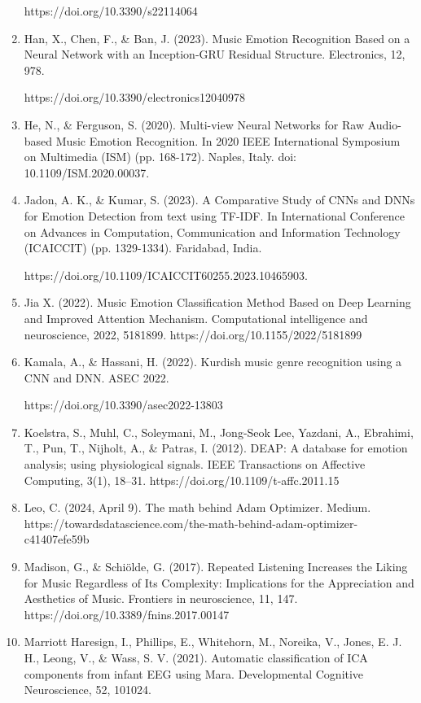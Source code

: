 \documentclass[fleqn,10pt]{SelfArx} %
\begin{document}
\begin{enumerate}
    https://doi.org/10.3390/s22114064
    \item Han, X., Chen, F., \& Ban, J. (2023). Music Emotion Recognition Based on a Neural Network with an Inception-GRU Residual Structure. Electronics, 12, 978.
    
    https://doi.org/10.3390/electronics12040978
    \item He, N., \& Ferguson, S. (2020). Multi-view Neural Networks for Raw Audio-based Music Emotion Recognition. In 2020 IEEE International Symposium on Multimedia (ISM) (pp. 168-172). Naples, Italy. doi: 10.1109/ISM.2020.00037.

    \item Jadon, A. K., \& Kumar, S. (2023). A Comparative Study of CNNs and DNNs for Emotion Detection from text using TF-IDF. In International Conference on Advances in Computation, Communication and Information Technology (ICAICCIT) (pp. 1329-1334). Faridabad, India. 
    
    https://doi.org/10.1109/ICAICCIT60255.2023.10465903.

    \item Jia X. (2022). Music Emotion Classification Method Based on Deep Learning and Improved Attention Mechanism. Computational intelligence and neuroscience, 2022, 5181899. https://doi.org/10.1155/2022/5181899

    \item Kamala, A., \& Hassani, H. (2022). Kurdish music genre recognition using a CNN and DNN. ASEC 2022.
    
    https://doi.org/10.3390/asec2022-13803 

    \item Koelstra, S., Muhl, C., Soleymani, M., Jong-Seok Lee, Yazdani, A., Ebrahimi, T., Pun, T., Nijholt, A., \& Patras, I. (2012). DEAP: A database for emotion analysis; using physiological signals. IEEE Transactions on Affective Computing, 3(1), 18–31. https://doi.org/10.1109/t-affc.2011.15 

    \item Leo, C. (2024, April 9). The math behind Adam Optimizer. Medium. https://towardsdatascience.com/the-math-behind-adam-optimizer-c41407efe59b 

    \item Madison, G., \& Schiölde, G. (2017). Repeated Listening Increases the Liking for Music Regardless of Its Complexity: Implications for the Appreciation and Aesthetics of Music. Frontiers in neuroscience, 11, 147. https://doi.org/10.3389/fnins.2017.00147
    \item Marriott Haresign, I., Phillips, E., Whitehorn, M., Noreika, V., Jones, E. J. H., Leong, V., \& Wass, S. V. (2021). Automatic classification of ICA components from infant EEG using Mara. Developmental Cognitive Neuroscience, 52, 101024. 
    

\end{enumerate}
\end{document}
